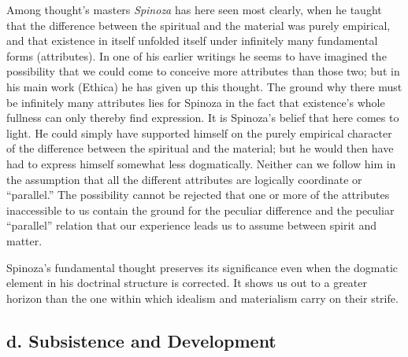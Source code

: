 \documentclass[12pt,a4paper]{book}
\newcommand{\opage}[1]{\marginnote{\footnotesize\textit{[#1]}}}
\begin{document}
Among thought's masters \emph{Spinoza} has here seen most clearly, when he taught that the difference
between the spiritual and the material was purely empirical, and that existence in itself unfolded itself
under infinitely many fundamental forms (attributes). In one of his earlier writings he seems to have
imagined the possibility that we could come to conceive more attributes than those two; but in his main
work (Ethica) he has given up this thought. The ground why there must be infinitely many attributes lies
for Spinoza in the fact that existence's whole fullness can only thereby find expression. It is Spinoza's
belief that here comes to light. He could simply have supported himself on the purely empirical character
of the difference between the spiritual and the material; but he would then have had to express himself
somewhat less \opage{338}dogmatically. Neither can we follow him in the assumption that all the different attributes
are logically coordinate or ``parallel.'' The possibility cannot be rejected that one or more of the
attributes inaccessible to us contain the ground for the peculiar difference and the peculiar ``parallel''
relation that our experience leads us to assume between spirit and matter.

Spinoza's fundamental thought preserves its significance even when the dogmatic element in his doctrinal
structure is corrected. It shows us out to a greater horizon than the one within which idealism and
materialism carry on their strife.

\subsection*{d. Subsistence and Development}
\end{document}

